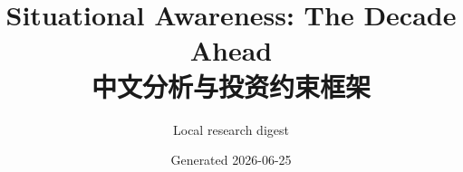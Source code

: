 \documentclass[11pt]{article}
\title{Situational Awareness: The Decade Ahead\\中文分析与投资约束框架}
\author{Local research digest}
\date{Generated 2026-06-25}
\begin{document}
\maketitle
\tableofcontents
\newpage

\nocite{*}


\end{document}
